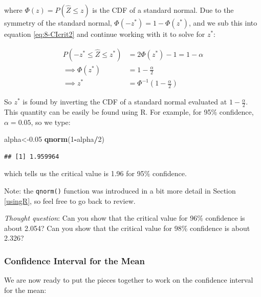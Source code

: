 \documentclass[
]{book}
\newenvironment{Shaded}{\begin{snugshade}}{\end{snugshade}}
\newcommand{\DecValTok}[1]{\textcolor[rgb]{0.00,0.00,0.81}{#1}}
\newcommand{\FloatTok}[1]{\textcolor[rgb]{0.00,0.00,0.81}{#1}}
\newcommand{\FunctionTok}[1]{\textcolor[rgb]{0.13,0.29,0.53}{\textbf{#1}}}
\newcommand{\NormalTok}[1]{#1}
\newcommand{\OtherTok}[1]{\textcolor[rgb]{0.56,0.35,0.01}{#1}}
\newcommand{\SpecialCharTok}[1]{\textcolor[rgb]{0.81,0.36,0.00}{\textbf{#1}}}
\begin{document}
where \(\Phi(z) = P(\hat{Z} \leq z)\) is the CDF of a standard normal. Due to the symmetry of the standard normal, \(\Phi(-z^{*}) = 1- \Phi(z^{*})\), and we sub this into equation \eqref{eq:8-CIcrit2} and continue working with it to solve for \(z^*\):

\begin{equation} 
\begin{split}
P(-z^{*} \leq \hat{Z} \leq z^{*}) &= 2 \Phi(z^*) - 1 = 1 - \alpha \\
\implies \Phi(z^*) &= 1 - \frac{\alpha}{2} \\
\implies z^* &= \Phi^{-1} \left(1 - \frac{\alpha}{2} \right)
\end{split}
\label{eq:8-CIcrit3}
\end{equation}

So \(z^*\) is found by inverting the CDF of a standard normal evaluated at \(1 - \frac{\alpha}{2}\). This quantity can be easily be found using R. For example, for 95\% confidence, \(\alpha = 0.05\), so we type:

\begin{Shaded}
\begin{Highlighting}[]
\NormalTok{alpha}\OtherTok{\textless{}{-}}\FloatTok{0.05}
\FunctionTok{qnorm}\NormalTok{(}\DecValTok{1}\SpecialCharTok{{-}}\NormalTok{alpha}\SpecialCharTok{/}\DecValTok{2}\NormalTok{)}
\end{Highlighting}
\end{Shaded}

\begin{verbatim}
## [1] 1.959964
\end{verbatim}

which tells us the critical value is 1.96 for 95\% confidence.

Note: the \texttt{qnorm()} function was introduced in a bit more detail in Section \ref{usingR}, so feel free to go back to review.

\emph{Thought question}: Can you show that the critical value for 96\% confidence is about 2.054? Can you show that the critical value for 98\% confidence is about 2.326?

\subsubsection{Confidence Interval for the Mean}\label{confidence-interval-for-the-mean-1}

We are now ready to put the pieces together to work on the confidence interval for the mean:
\end{document}
